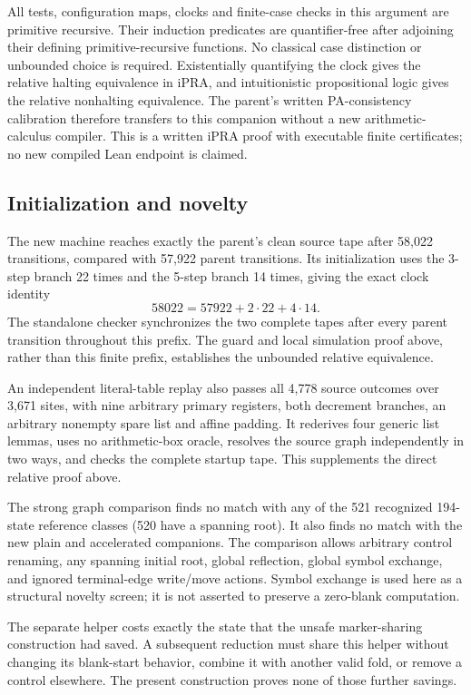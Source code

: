 All tests, configuration maps, clocks and finite-case checks in this
argument are primitive recursive. Their induction predicates are
quantifier-free after adjoining their defining primitive-recursive
functions. No classical case distinction or unbounded choice is required.
Existentially quantifying the clock gives the relative halting equivalence
in iPRA, and intuitionistic propositional logic gives the relative
nonhalting equivalence. The parent's written PA-consistency calibration
therefore transfers to this companion without a new arithmetic-calculus
compiler. This is a written iPRA proof with executable finite certificates;
no new compiled Lean endpoint is claimed.

\subsection{Initialization and novelty}

The new machine reaches exactly the parent's clean source tape after
58,022 transitions, compared with 57,922 parent transitions. Its
initialization uses the 3-step branch 22 times and the 5-step branch
14 times, giving the exact clock identity
\[
 58022=57922+2\cdot22+4\cdot14.
\]
The standalone checker synchronizes the two complete tapes after every
parent transition throughout this prefix. The guard and local simulation
proof above, rather than this finite prefix, establishes the unbounded
relative equivalence.

An independent literal-table replay also passes all 4,778 source outcomes
over 3,671 sites, with nine arbitrary primary registers, both decrement
branches, an arbitrary nonempty spare list and affine padding. It rederives
four generic list lemmas, uses no arithmetic-box oracle, resolves the source
graph independently in two ways, and checks the complete startup tape.
This supplements the direct relative proof above.

The strong graph comparison finds no match with any of the 521 recognized
194-state reference classes (520 have a spanning root). It also finds no
match with the new plain and accelerated companions. The comparison allows
arbitrary control renaming, any spanning initial root, global reflection,
global symbol exchange, and ignored terminal-edge write/move actions.
Symbol exchange is used here as a structural novelty screen; it is not
asserted to preserve a zero-blank computation.

The separate helper costs exactly the state that the unsafe marker-sharing
construction had saved. A subsequent reduction must share this helper
without changing its blank-start behavior, combine it with another valid
fold, or remove a control elsewhere. The present construction proves none
of those further savings.
